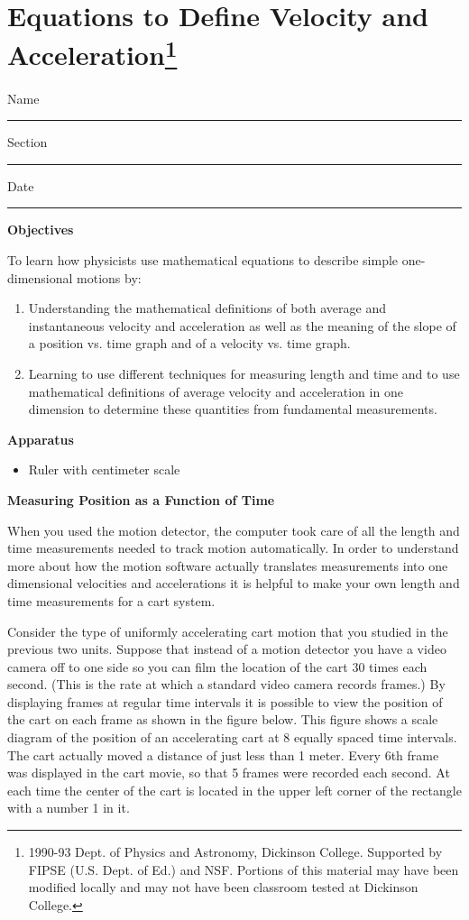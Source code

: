 
\section{Equations to Define Velocity and Acceleration\footnote{
1990-93 Dept. of Physics and Astronomy, Dickinson College. Supported by FIPSE
(U.S. Dept. of Ed.) and NSF. Portions of this material may have been modified
locally and may not have been classroom tested at Dickinson College.
}}

Name \rule{2.0in}{0.1pt}\hfill{}Section \rule{1.0in}{0.1pt}\hfill{}Date \rule{1.0in}{0.1pt}

\textbf{Objectives} 

To learn how physicists use mathematical equations to describe simple one-dimensional
motions by:

\begin{enumerate}
\item Understanding the mathematical definitions of both average and instantaneous
velocity and acceleration as well as the meaning of the slope of a position
vs. time graph and of a velocity vs. time graph.
\item Learning to use different techniques for measuring length and time and to use
mathematical definitions of average velocity and acceleration in one dimension
to determine these quantities from fundamental measurements.
\end{enumerate}
\textbf{Apparatus} 

\begin{itemize}
\item Ruler with centimeter scale
\end{itemize}
\textbf{Measuring Position as a Function of Time} 

When you used the motion detector, the computer took care of all the length
and time measurements needed to track motion automatically. In order to understand
more about how the motion software actually translates measurements into one
dimensional velocities and accelerations it is helpful to make your own length
and time measurements for a cart system.

Consider the type of uniformly accelerating cart motion that you studied in
the previous two units. Suppose that instead of a motion detector you have a
video camera off to one side so you can film the location of the cart 30 times
each second. (This is the rate at which a standard video camera records frames.)
By displaying frames at regular time intervals it is possible to view the position
of the cart on each frame as shown in the figure below. This figure shows a
scale diagram of the position of an accelerating cart at 8 equally spaced time
intervals. The cart actually moved a distance of just less than 1 meter. Every
6th frame was displayed in the cart movie, so that 5 frames were recorded each
second. At each time the center of the cart is located in the upper left corner
of the rectangle with a number 1 in it. 

